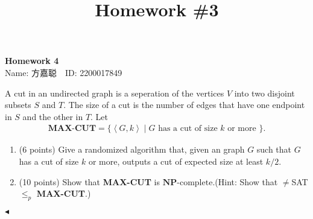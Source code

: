 \documentclass[11pt]{article}
\title{Homework \#3}
\newcommand{\NPC}{\mathbf{NP}\text{-complete}}
\newcommand{\1}{\mathbf{1}}
\newenvironment{problem}[2][Problem]{\begin{trivlist}
\item[\hskip \labelsep{\bfseries#1}\hskip\labelsep{\bfseries#2.}]}{\hfill$\blacktriangleleft$\end{trivlist}}
\begin{document}
\kaishu

\pagestyle{fancy}
\chead{}

\begin{center}
    {\LARGE \bf Homework 4}\\
    {Name: 方嘉聪\ \  ID: 2200017849}            %
\end{center}

\begin{problem}{1.(16 points)}
    A cut in an undirected graph is a seperation of the vertices $V$ into two disjoint subsets $S$ and $T$. The size of a cut is the number of edges that have one endpoint in $S$ and the other in $T$. Let
    \begin{align*}
        \textbf{MAX-CUT} = \{ \left\langle G,k \right\rangle \mid G \text{ has a cut of size $k$ or more }\}.
    \end{align*}
    \begin{enumerate}[label = \alph*.)]
        \item (6 points) Give a randomized algorithm that, given an graph $G$ such that $G$ has a cut of size $k$ or more, outputs a cut of expected size at least $k/2$. 
        \item (10 points) Show that \textbf{MAX-CUT} is $\NPC$.(Hint: Show that $\neq$SAT $\le_p$ \textbf{MAX-CUT}.) 
    \end{enumerate}
\end{problem}
\end{document}
